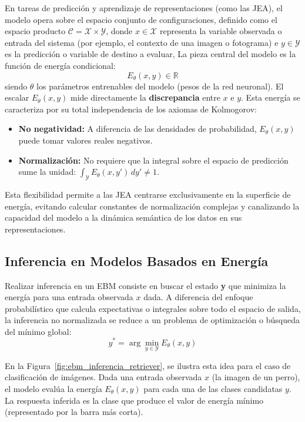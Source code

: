 En tareas de predicción y aprendizaje de representaciones (como las JEA), el modelo opera sobre el espacio conjunto de configuraciones, definido como el espacio producto $\mathcal{C} = \mathcal{X} \times \mathcal{Y}$, donde $x \in \mathcal{X}$ representa la variable observada o entrada del sistema (por ejemplo, el contexto de una imagen o fotograma) e $y \in \mathcal{Y}$ es la predicción o variable de destino a evaluar, La pieza central del modelo es la función de energía condicional:
\begin{equation}
E_\theta(x, y) \in \mathbb{R}
\end{equation}
siendo $\theta$ los parámetros entrenables del modelo (pesos de la red neuronal). El escalar $E_\theta(x, y)$ mide directamente la \textbf{discrepancia} entre $x$ e $y$. Esta energía se caracteriza por su total independencia de los axiomas de Kolmogorov:
\begin{itemize}
    \item \textbf{No negatividad:} A diferencia de las densidades de probabilidad, $E_\theta(x, y)$ puede tomar valores reales negativos.
    \item \textbf{Normalización:} No requiere que la integral sobre el espacio de predicción sume la unidad: $\int_{\mathcal{Y}} E_\theta(x, y') \, dy' \neq 1$.
\end{itemize}

Esta flexibilidad permite a las JEA centrarse exclusivamente en la superficie de energía, evitando calcular constantes de normalización complejas y canalizando la capacidad del modelo a la dinámica semántica de los datos en sus representaciones.

\subsection{Inferencia en Modelos Basados en Energía}
Realizar inferencia en un EBM consiste en buscar el estado \textbf{y} que minimiza la energía para una entrada observada $x$ dada. A diferencia del enfoque probabilístico que calcula expectativas o integrales sobre todo el espacio de salida, la inferencia no normalizada se reduce a un problema de optimización o búsqueda del mínimo global:
\begin{equation}
\label{eq:ebm_inferencia}
y^* = \arg\min_{y \in \mathcal{Y}} E_\theta(x, y)
\end{equation}

En la Figura~\ref{fig:ebm_inferencia_retriever}, se ilustra esta idea para el caso de clasificación de imágenes. Dada una entrada observada $x$ (la imagen de un perro), el modelo evalúa la energía $E_\theta(x, y)$ para cada una de las clases candidatas $y$. La respuesta inferida es la clase que produce el valor de energía mínimo (representado por la barra más corta).

